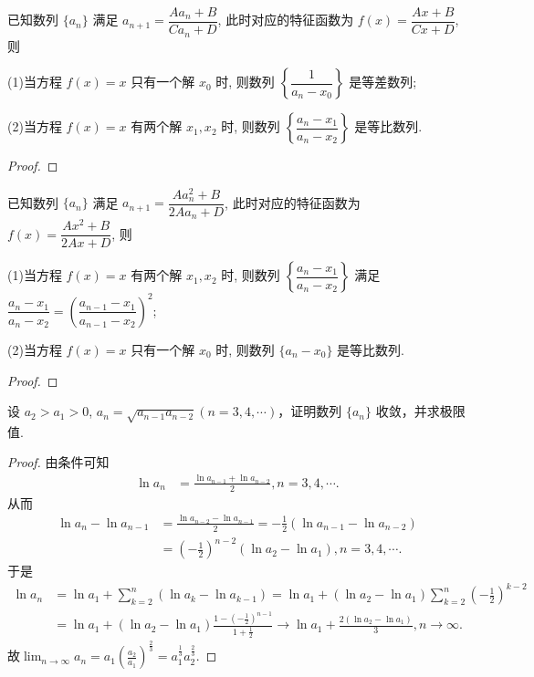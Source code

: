 \documentclass[../../main.tex]{subfiles}%
\begin{document}
\begin{proposition}\label{proposition:可直接求通项--类型三}
已知数列 $\{a_n\}$ 满足 $a_{n + 1} = \dfrac{A a_n + B}{C a_n + D}$, 此时对应的特征函数为 $f(x) = \dfrac{A x + B}{C x + D}$, 则

(1)当方程 $f(x) = x$ 只有一个解 $x_0$ 时, 则数列 $\left\{ \dfrac{1}{a_n - x_0} \right\}$ 是等差数列; 

(2)当方程 $f(x) = x$ 有两个解 $x_1, x_2$ 时, 则数列 $\left\{ \dfrac{a_n - x_1}{a_n - x_2} \right\}$ 是等比数列.
\end{proposition}
\begin{proof}

\end{proof}

\begin{proposition}\label{proposition:可直接求通项--类型四}
已知数列 $\{a_n\}$ 满足 $a_{n + 1} = \dfrac{A a_n^2 + B}{2 A a_n + D}$, 此时对应的特征函数为 $f(x) = \dfrac{A x^2 + B}{2 A x + D}$, 则

(1)当方程 $f(x) = x$ 有两个解 $x_1, x_2$ 时, 则数列 $\left\{ \dfrac{a_n - x_1}{a_n - x_2} \right\}$ 满足 $\dfrac{a_n - x_1}{a_n - x_2} = \left( \dfrac{a_{n - 1} - x_1}{a_{n - 1} - x_2} \right)^2$; 

(2)当方程 $f(x) = x$ 只有一个解 $x_0$ 时, 则数列 $\{a_n - x_0\}$ 是等比数列.
\end{proposition}
\begin{proof}

\end{proof}



\begin{example}
设 $a_2 > a_1 > 0$, $a_n = \sqrt{a_{n - 1}a_{n - 2}}(n = 3, 4, \cdots)$，证明数列 $\{a_n\}$ 收敛，并求极限值.
\end{example}
\begin{proof}
由条件可知
\begin{align*}
\ln a_n&=\frac{\ln a_{n-1}+\ln a_{n-2}}{2},n=3,4,\cdots .
\end{align*}
从而
\begin{align*}
\ln a_n-\ln a_{n-1}&=\frac{\ln a_{n-2}-\ln a_{n-1}}{2}=-\frac{1}{2}\left( \ln a_{n-1}-\ln a_{n-2} \right) 
\\
&=\left( -\frac{1}{2} \right) ^{n-2}\left( \ln a_2-\ln a_1 \right) ,n=3,4,\cdots .
\end{align*}
于是
\begin{align*}
\ln a_n&=\ln a_1+\sum_{k=2}^n{\left( \ln a_k-\ln a_{k-1} \right)}=\ln a_1+\left( \ln a_2-\ln a_1 \right) \sum_{k=2}^n{\left( -\frac{1}{2} \right) ^{k-2}}
\\
&=\ln a_1+\left( \ln a_2-\ln a_1 \right) \frac{1-\left( -\frac{1}{2} \right) ^{n-1}}{1+\frac{1}{2}}\rightarrow \ln a_1+\frac{2\left( \ln a_2-\ln a_1 \right)}{3},n\rightarrow \infty .
\end{align*}
故$\lim_{n\rightarrow \infty}a_n=a_1\left( \frac{a_2}{a_1} \right) ^{\frac{2}{3}}=a_{1}^{\frac{1}{3}}a_{2}^{\frac{2}{3}}.$
\end{proof}
\end{document}
